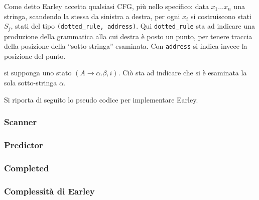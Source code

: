 \documentclass{subfiles}
\begin{document}
Come detto Earley accetta qualsiasi CFG, più nello specifico: data $x_{1} \ldots x_{n}$ una stringa,
scandendo la stessa da sinistra a destra, per ogni $x_{i}$ si costruiscono stati $S_{j}$, stati del tipo \lstinline{(dotted_rule, address)}.
Qui \lstinline{dotted_rule} sta ad indicare una produzione della grammatica alla cui destra è posto un punto,
per tenere traccia della posizione della ``sotto-stringa'' esaminata. Con \lstinline{address} si indica invece la posizione del punto.

\begin{Example*}
    si supponga uno stato $(A \to \alpha . \beta, i)$. Ciò sta ad indicare che si è esaminata la sola sotto-stringa $\alpha$.
\end{Example*}

\noindent Si riporta di seguito lo pseudo codice per implementare Earley.


\subsubsection{Scanner}


\subsubsection{Predictor}


\subsubsection{Completed}


\subsubsection{Complessità di Earley}

\end{document}
